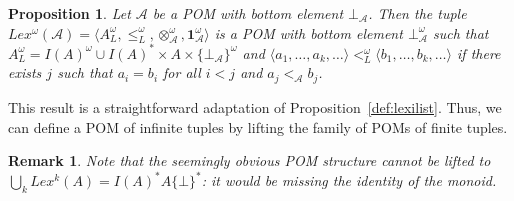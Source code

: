 \documentclass[a4paper]{elsarticle}
\newtheorem{remark}{Remark}
\newtheorem{proposition}{Proposition}
\newcommand{\monop}{\otimes}
\newcommand{\1}{\mathbf{1}}
\begin{document}
\begin{proposition}
Let $\mathcal{A}$ be a POM with bottom element $\bot_\mathcal{A}$.
%
Then the tuple $Lex^\omega(\mathcal{A}) = \langle A_L^\omega, \leq_L^\omega, \monop^\omega_\mathcal{A}, \1^\omega_\mathcal{A} \rangle$ 
is a POM	with bottom element $\bot^\omega_\mathcal{A}$ such that 
$A_L^\omega = I(A)^\omega \cup I(A)^\ast \times A \times \{\bot_\mathcal{A}\}^\omega$
and $\langle a_1, \ldots, a_k, \ldots \rangle <^\omega_L \langle b_1, \ldots, b_k, \ldots \rangle$ if there exists $j$ such that
$a_i = b_i$ for all $i < j$ and %
$a_{j} <_\mathcal{A}  b_{j}$.
\end{proposition}

This result is a straightforward adaptation of Proposition~\ref{def:lexilist}.
%
Thus, we can define a POM of infinite tuples by lifting the 
family of POMs of finite tuples.

\begin{remark}
	Note that the seemingly obvious POM structure cannot be 
	lifted to $\bigcup_k Lex^k(A) =  I(A)^\ast A \{\bot\}^\ast$: 
	it would be missing the identity of the monoid.
\end{remark}
\end{document}
